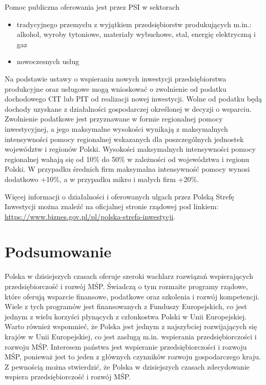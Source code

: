 \documentclass[11pt]{article}
\begin{document}
Pomoc publiczna oferowania jest przez PSI w sektorach
\begin{itemize}
  \item tradycyjnego przemysłu z wyjątkiem przedsiębiorstw produkujących m.in.: alkohol, 
  wyroby tytoniowe, materiały wybuchowe, stal, energię elektryczną i gaz
  \item nowoczesnych usług
\end{itemize}

Na podstawie ustawy o wspieraniu nowych inwestycji przedsiębiorstwa produkcyjne oraz usługowe mogą wnioskować 
o zwolnienie od podatku dochodowego CIT lub PIT od realizacji nowej inwestycji. 
Wolne od podatku będą dochody uzyskane z działalności gospodarczej określonej w decyzji o wsparciu. 
Zwolnienie podatkowe jest przyznawane w formie regionalnej pomocy inwestycyjnej, a jego maksymalne wysokości 
wynikają z maksymalnych intensywności pomocy regionalnej wskazanych dla poszczególnych jednostek województw i regionów Polski.
Wysokości maksymalnych intensywności pomocy regionalnej wahają się od 10\% do 50\% w zależności od województwa i regionu Polski.
W przypadku średnich firm maksymalna intensywność pomocy wynosi dodatkowo +10\%, a w przypadku mikro i małych firm +20\%.

Więcej informacji o działalności i oferowanych ulgach przez Polską Strefę Inwestycji można
znaleźć na oficjalnej stronie rządowej pod linkiem: \url{https://www.biznes.gov.pl/pl/polska-strefa-inwestycji}.

\section*{Podsumowanie}

Polska w dzisiejszych czasach oferuje szeroki wachlarz rozwiązań wspierających przedsiębiorczość i rozwój MŚP.
Świadczą o tym rozmaite programy rządowe, które oferują wsparcie finansowe, podatkowe oraz szkolenia i rozwój kompetencji.
Wiele z tych programów jest finansowanych z Funduszy Europejskich, co jest jednym z wielu korzyści płynących z członkostwa Polski w Unii Europejskiej.
Warto również wspomnieć, że Polska jest jednym z najszybciej rozwijających się krajów w Unii Europejskiej, co jest zasługą m.in.
wspierania przedsiębiorczości i rozwoju MŚP.
Interesem państwa jest wspieranie przedsiębiorczości i rozwoju MŚP, ponieważ jest to jeden z głównych czynników rozwoju gospodarczego kraju.
Z pewnością można stwierdzić, że Polska w dzisiejszych czasach zdecydowanie wspiera przedsiębiorczość i rozwój MŚP.

\pagebreak

{}

\end{document}
